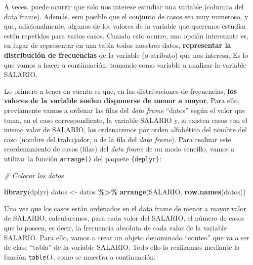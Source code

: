 \documentclass[
]{book}
\newenvironment{Shaded}{\begin{snugshade}}{\end{snugshade}}
\newcommand{\CommentTok}[1]{\textcolor[rgb]{0.56,0.35,0.01}{\textit{#1}}}
\newcommand{\FunctionTok}[1]{\textcolor[rgb]{0.13,0.29,0.53}{\textbf{#1}}}
\newcommand{\NormalTok}[1]{#1}
\newcommand{\OtherTok}[1]{\textcolor[rgb]{0.56,0.35,0.01}{#1}}
\newcommand{\SpecialCharTok}[1]{\textcolor[rgb]{0.81,0.36,0.00}{\textbf{#1}}}
\begin{document}
A veces, puede ocurrir que solo nos interese estudiar una variable (columna del data frame).
Además, esm posible que el conjunto de casos sea muy numeroso, y que, adicionalmente, algunos de los valores de la variable que queremos estudiar estén repetidos para varios casos.
Cuando esto ocurre, una opción interesante es, en lugar de representar en una tabla todos nuestros datos, \textbf{representar la distribución de frecuencias} de la variable (o atributo) que nos interesa.
Es lo que vamos a hacer a continuación, tomando como variable a analizar la variable SALARIO.

Lo primero a tener en cuenta es que, en las distribuciones de frecuencias, \textbf{los valores de la variable suelen disponerse de menor a mayor}.
Para ello, previamente vamos a ordenar las filas del \emph{data frame} ``datos'' según el valor que toma, en el caso correspondiente, la variable SALARIO y, si existen casos con el mismo valor de SALARIO, los ordenaremos por orden alfabético del nombre del caso (nombre del trabajador, o de la fila del \emph{data frame}).
Para realizar este reordenamiento de casos (filas) del \emph{data frame} de un modo sencillo, vamos a utilizar la función \texttt{arrange()} del paquete \texttt{\{deplyr\}}:

\begin{Shaded}
\begin{Highlighting}[]
\CommentTok{\# Colocar los datos}

\FunctionTok{library}\NormalTok{(dplyr)}
\NormalTok{datos }\OtherTok{\textless{}{-}}\NormalTok{ datos }\SpecialCharTok{\%\textgreater{}\%} \FunctionTok{arrange}\NormalTok{(SALARIO, }\FunctionTok{row.names}\NormalTok{(datos))}
\end{Highlighting}
\end{Shaded}

Una vez que los casos están ordenados en el data frame de menor a mayor valor de SALARIO, calcularemos, para cada valor del SALARIO, el número de casos que lo poseen, es decir, la frecuencia absoluta de cada valor de la variable SALARIO.
Para ello, vamos a crear un objeto denominado ``conteo'' que va a ser de clase ``tabla'' de la variable SALARIO.
Todo ello lo realizamos mediante la función \texttt{table()}, como se muestra a continuación:

\begin{Shaded}
\end{Shaded}
\end{document}
